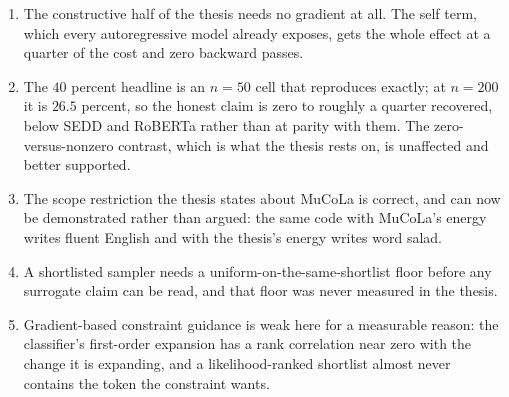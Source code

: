 \documentclass[11pt,a4paper]{article}
\begin{document}
\begin{enumerate}
\item The constructive half of the thesis needs no gradient at all. The self term, which
  every autoregressive model already exposes, gets the whole effect at a quarter of the
  cost and zero backward passes.
\item The $40$ percent headline is an $n=50$ cell that reproduces exactly; at $n=200$ it
  is $26.5$ percent, so the honest claim is zero to roughly a quarter recovered, below
  SEDD and RoBERTa rather than at parity with them. The zero-versus-nonzero contrast,
  which is what the thesis rests on, is unaffected and better supported.
\item The scope restriction the thesis states about MuCoLa is correct, and can now be
  demonstrated rather than argued: the same code with MuCoLa's energy writes fluent
  English and with the thesis's energy writes word salad.
\item A shortlisted sampler needs a uniform-on-the-same-shortlist floor before any
  surrogate claim can be read, and that floor was never measured in the thesis.
\item Gradient-based constraint guidance is weak here for a measurable reason: the
  classifier's first-order expansion has a rank correlation near zero with the change it
  is expanding, and a likelihood-ranked shortlist almost never contains the token the
  constraint wants.
\end{enumerate}
\end{document}
